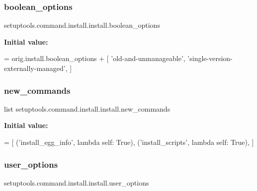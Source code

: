\subsubsection{\texorpdfstring{boolean\+\_\+options}{boolean\_options}}
{\footnotesize\ttfamily setuptools.\+command.\+install.\+install.\+boolean\+\_\+options\hspace{0.3cm}{\ttfamily [static]}}

{\bfseries Initial value\+:}
\begin{DoxyCode}
=  orig.install.boolean\_options + [
        \textcolor{stringliteral}{'old-and-unmanageable'}, \textcolor{stringliteral}{'single-version-externally-managed'},
    ]
\end{DoxyCode}
\mbox{\label{classsetuptools_1_1command_1_1install_1_1install_af9e3535c1d0551beec2aded05f3e9028}} 
\subsubsection{\texorpdfstring{new\+\_\+commands}{new\_commands}}
{\footnotesize\ttfamily list setuptools.\+command.\+install.\+install.\+new\+\_\+commands\hspace{0.3cm}{\ttfamily [static]}}

{\bfseries Initial value\+:}
\begin{DoxyCode}
=  [
        (\textcolor{stringliteral}{'install\_egg\_info'}, \textcolor{keyword}{lambda} self: \textcolor{keyword}{True}),
        (\textcolor{stringliteral}{'install\_scripts'}, \textcolor{keyword}{lambda} self: \textcolor{keyword}{True}),
    ]
\end{DoxyCode}
\mbox{\label{classsetuptools_1_1command_1_1install_1_1install_a4f9ca37416e4efa7d7fe6425cf86883a}} 
\subsubsection{\texorpdfstring{user\+\_\+options}{user\_options}}
{\footnotesize\ttfamily setuptools.\+command.\+install.\+install.\+user\+\_\+options\hspace{0.3cm}{\ttfamily [static]}}

